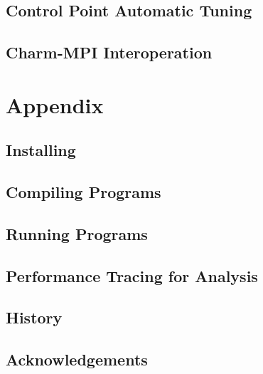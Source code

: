 \documentclass[10pt]{report}
\begin{document}
\chapter{Control Point Automatic Tuning}
\label{sec:controlpoint}
  


\chapter{Charm-MPI Interoperation}
\label{sec:interop}
  

\part{Appendix}
\appendix

%

\chapter{Installing \charm}
\label{sec:install}
  

\chapter{Compiling \charm Programs}
\label{sec:compile}
  

\chapter{Running \charm Programs}
\label{sec:run}
  

\chapter{Performance Tracing for Analysis}
\label{sec:trace-projections}
  


\chapter{History}
  

\chapter {Acknowledgements}
  


\end{document}

